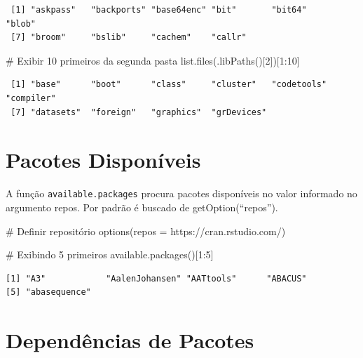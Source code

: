\documentclass[
  letterpaper,
  DIV=11,
  numbers=noendperiod]{scrreprt}
\newenvironment{Shaded}{\begin{snugshade}}{\end{snugshade}}
\newcommand{\AttributeTok}[1]{\textcolor[rgb]{0.40,0.45,0.13}{#1}}
\newcommand{\CommentTok}[1]{\textcolor[rgb]{0.37,0.37,0.37}{#1}}
\newcommand{\DecValTok}[1]{\textcolor[rgb]{0.68,0.00,0.00}{#1}}
\newcommand{\FunctionTok}[1]{\textcolor[rgb]{0.28,0.35,0.67}{#1}}
\newcommand{\NormalTok}[1]{\textcolor[rgb]{0.00,0.23,0.31}{#1}}
\newcommand{\SpecialCharTok}[1]{\textcolor[rgb]{0.37,0.37,0.37}{#1}}
\newcommand{\StringTok}[1]{\textcolor[rgb]{0.13,0.47,0.30}{#1}}
\begin{document}
\begin{verbatim}
 [1] "askpass"   "backports" "base64enc" "bit"       "bit64"     "blob"     
 [7] "broom"     "bslib"     "cachem"    "callr"    
\end{verbatim}

\begin{Shaded}
\begin{Highlighting}[]
\CommentTok{\# Exibir 10 primeiros da segunda pasta}
\FunctionTok{list.files}\NormalTok{(}\FunctionTok{.libPaths}\NormalTok{()[}\DecValTok{2}\NormalTok{])[}\DecValTok{1}\SpecialCharTok{:}\DecValTok{10}\NormalTok{]}
\end{Highlighting}
\end{Shaded}

\begin{verbatim}
 [1] "base"      "boot"      "class"     "cluster"   "codetools" "compiler" 
 [7] "datasets"  "foreign"   "graphics"  "grDevices"
\end{verbatim}

\hypertarget{pacotes-disponuxedveis}{%
\section{Pacotes Disponíveis}\label{pacotes-disponuxedveis}}

A função \texttt{available.packages} procura pacotes disponíveis no
valor informado no argumento repos. Por padrão é buscado de
getOption(``repos'').

\begin{Shaded}
\begin{Highlighting}[]
\CommentTok{\# Definir repositório}
\FunctionTok{options}\NormalTok{(}\AttributeTok{repos =} \StringTok{\textquotesingle{}https://cran.rstudio.com/\textquotesingle{}}\NormalTok{)}

\CommentTok{\# Exibindo 5 primeiros}
\FunctionTok{available.packages}\NormalTok{()[}\DecValTok{1}\SpecialCharTok{:}\DecValTok{5}\NormalTok{]}
\end{Highlighting}
\end{Shaded}

\begin{verbatim}
[1] "A3"            "AalenJohansen" "AATtools"      "ABACUS"       
[5] "abasequence"  
\end{verbatim}

\hypertarget{dependuxeancias-de-pacotes}{%
\section{Dependências de Pacotes}\label{dependuxeancias-de-pacotes}}
\end{document}
